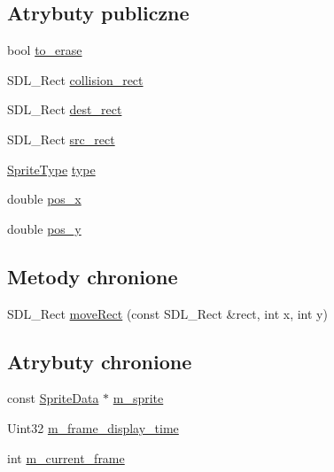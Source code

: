 \subsection*{Atrybuty publiczne}
\begin{DoxyCompactItemize}
\item 
bool \hyperlink{class_object_a77c2ada7189758c530ab24a7b366d3fb}{to\+\_\+erase}
\item 
S\+D\+L\+\_\+\+Rect \hyperlink{class_object_a308c5fde145e854d4a2808283f18e14b}{collision\+\_\+rect}
\item 
S\+D\+L\+\_\+\+Rect \hyperlink{class_object_aa11a2e0ccb927f542aee786bc7bd731d}{dest\+\_\+rect}
\item 
S\+D\+L\+\_\+\+Rect \hyperlink{class_object_aef9bec0e47c5d8cc04145de236881f47}{src\+\_\+rect}
\item 
\hyperlink{type_8h_ac6fa10729dffeb6a192492f13c25e31a}{Sprite\+Type} \hyperlink{class_object_a1b89f32cd9e0040f8a2455f3cef7d0d2}{type}
\item 
double \hyperlink{class_object_a1f71a5693147aecc701db4ab51d3edcc}{pos\+\_\+x}
\item 
double \hyperlink{class_object_a986134c27f3e74ba41a4d28e20b183a9}{pos\+\_\+y}
\end{DoxyCompactItemize}
\subsection*{Metody chronione}
\begin{DoxyCompactItemize}
\item 
S\+D\+L\+\_\+\+Rect \hyperlink{class_object_a98ac32f03f7ec5f9bf082cd697a9b4fc}{move\+Rect} (const S\+D\+L\+\_\+\+Rect \&rect, int x, int y)
\end{DoxyCompactItemize}
\subsection*{Atrybuty chronione}
\begin{DoxyCompactItemize}
\item 
const \hyperlink{struct_sprite_data}{Sprite\+Data} $\ast$ \hyperlink{class_object_a07c5c7138bb081dacbe9ddfb0295ced7}{m\+\_\+sprite}
\item 
Uint32 \hyperlink{class_object_a76a3f8ee17746de53b8f162b5df2c837}{m\+\_\+frame\+\_\+display\+\_\+time}
\item 
int \hyperlink{class_object_a4e03c944bc9142a5c34b7049c20c4301}{m\+\_\+current\+\_\+frame}
\end{DoxyCompactItemize}


